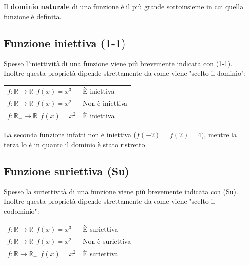 Il \textbf{dominio naturale} di una funzione è il più grande sottoinsieme in cui quella funzione è definita.

\subsection{Funzione iniettiva (1-1)}


Spesso l'iniettività di una funzione viene più brevemente indicata con (1-1). Inoltre questa proprietà dipende strettamente da come viene "scelto il dominio":

\begin{table}[H]
\centering
\begin{tabular}{ll}
$f: \mathbb{R} \to \mathbb{R}\;\, f(x) = x^3$          & È iniettiva      \\
$f: \mathbb{R} \to \mathbb{R}\;\, f(x) = x^2$        & Non è iniettiva  \\
$f: \mathbb{R}_{+} \to \mathbb{R}\;\, f(x) = x^2$ & È iniettiva     
\end{tabular}
\end{table}

La seconda funzione infatti non è iniettiva ($f(-2) = f(2) = 4$), mentre la terza lo è in quanto il dominio è stato ristretto.

\subsection{Funzione suriettiva (Su)}


Spesso la suriettività di una funzione viene più brevemente indicata con (Su). Inoltre questa proprietà dipende strettamente da come viene "scelto il codominio":

\begin{table}[H]
\centering
\begin{tabular}{ll}
$f: \mathbb{R} \to \mathbb{R}\;\, f(x) = x^3$          & È suriettiva      \\
$f: \mathbb{R} \to \mathbb{R}\;\, f(x) = x^2$        & Non è suriettiva  \\
$f: \mathbb{R} \to \mathbb{R}_{+}\;\, f(x) = x^2$ & È suriettiva     
\end{tabular}
\end{table}

